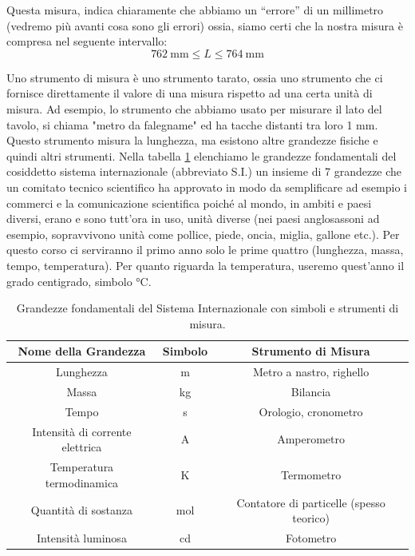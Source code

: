 \documentclass[12pt,a4paper,oneside]{book}
\theoremstyle{esercizio}
\begin{document}
Questa misura, indica chiaramente che abbiamo un ``errore'' di un millimetro (vedremo più avanti cosa sono gli errori) ossia, siamo certi che la nostra misura è compresa nel seguente intervallo:
\[
\SI{762}{\milli\meter} \le L \le \SI{764}{\milli\meter}
\]


Uno strumento di misura è uno strumento tarato, ossia uno strumento che ci fornisce direttamente  il valore di  una misura rispetto ad una certa unità di misura. Ad esempio, lo strumento che abbiamo usato per misurare il lato del tavolo, si chiama "metro da falegname" ed ha tacche distanti tra loro 1 mm. Questo strumento misura la lunghezza, ma esistono altre grandezze fisiche e quindi altri strumenti. Nella tabella \ref{tab:si_units} elenchiamo le grandezze fondamentali del cosiddetto sistema internazionale (abbreviato S.I.) un insieme di 7 grandezze che un comitato tecnico scientifico ha approvato in modo da semplificare ad esempio i commerci e la comunicazione scientifica poiché al mondo, in ambiti e paesi diversi, erano e sono tutt'ora in uso, unità diverse (nei paesi anglosassoni ad esempio, sopravvivono unità come pollice, piede, oncia, miglia, gallone etc.). Per questo corso ci serviranno il primo anno solo le prime quattro (lunghezza, massa, tempo, temperatura). Per quanto riguarda la temperatura, useremo quest'anno il grado centigrado, simbolo °C. 

\begin{table}[h!]
	\centering
	\begin{tabular}{|c|c|c|}
		\hline
		\textbf{Nome della Grandezza} & \textbf{Simbolo} & \textbf{Strumento di Misura} \\
		\hline
		Lunghezza & m & Metro a nastro, righello \\
		\hline
		Massa & kg & Bilancia \\
		\hline
		Tempo & s & Orologio, cronometro \\
		\hline
		Intensità di corrente elettrica & A & Amperometro \\
		\hline
		Temperatura termodinamica & K & Termometro \\
		\hline
		Quantità di sostanza & mol & Contatore di particelle (spesso teorico) \\
		\hline
		Intensità luminosa & cd & Fotometro \\
		\hline
	\end{tabular}
	\caption{Grandezze fondamentali del Sistema Internazionale con simboli e strumenti di misura.}
	\label{tab:si_units}
\end{table}
\end{document}
